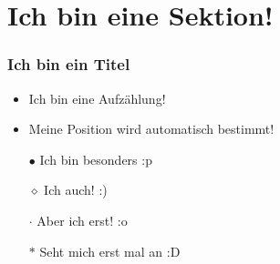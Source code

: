 \section{Ich bin eine Sektion!}

\begin{frame}\frametitle{Ich bin ein Titel}
    \begin{itemize}
        \item Ich bin eine Aufzählung!
        \item Meine Position wird automatisch bestimmt!
        \item[$\bullet$] Ich bin besonders :p
        \item[$\diamond$] Ich auch! :)
        \item[$\cdot$] Aber ich erst! :o
        \item[$\ast$] Seht mich erst mal an :D
    \end{itemize}
\end{frame}

